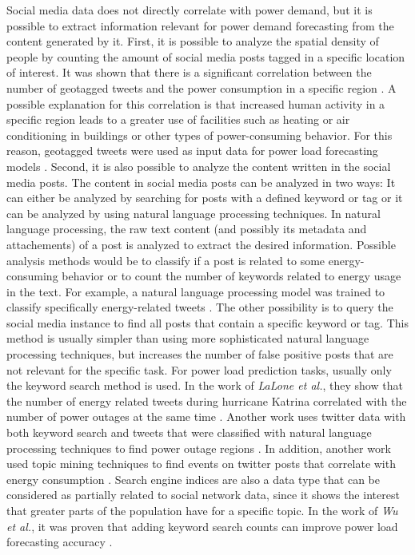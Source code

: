 Social media data does not directly correlate with power demand, but it is
possible to extract information relevant for power demand forecasting
from the content generated by it.
First, it is possible to analyze the spatial density of people by 
counting the amount of social media posts tagged in a specific location of interest. 
It was shown that there is a significant
correlation between the number of geotagged tweets
and the power consumption in a specific region \cite{twittergeoloccorr}.
A possible explanation for this correlation is that 
increased human activity in a specific region leads to a greater 
use of facilities such as heating or air conditioning in buildings or 
other types of power-consuming behavior.
For this reason, geotagged tweets were used as input data for 
power load forecasting models 
\cite{twittergeolocforecasting} \cite{twittergeolocforecasting2}.
Second, it is also possible to analyze the content written in the 
social media posts. The content in social media posts can be 
analyzed in two ways: 
It can either be analyzed by searching for posts with a defined keyword or tag
or it can be analyzed by using natural language processing techniques. 
In natural language processing, the raw text content 
(and possibly its metadata and attachements) of a post is analyzed
to extract the desired information. Possible analysis
methods would be to classify if a post is related to some energy-consuming
behavior or to count the number of keywords related to energy usage in the text.
For example, a natural language processing model was trained to 
classify specifically energy-related tweets \cite{energybert}.
The other possibility is to query the social media instance 
to find all posts that contain a specific keyword or tag.
This method is usually simpler than using more sophisticated natural 
language processing techniques, but increases the number of false positive 
posts that are not relevant for the specific task.
For power load prediction tasks, usually only the keyword search method is used.
In the work of \textit{LaLone et al.}, they show that the number of energy
related tweets during hurricane Katrina correlated with the number of 
power outages at the same time \cite{poweroutagetwitter}.
Another work uses twitter data with both keyword search and 
tweets that were classified with natural language processing techniques
to find power outage regions \cite{twitterpoweroutagelighttime}.
In addition, another work used topic mining techniques to find
events on twitter posts that correlate with energy consumption 
\cite{twittertopicevent}.
Search engine indices are also a data type that can be considered 
as partially related to social network data, since it shows the 
interest that greater parts of the population have for a specific topic.
In the work of \textit{Wu et al.}, it was proven that adding 
keyword search counts can improve power load forecasting accuracy 
\cite{googlepowerforecast}.


